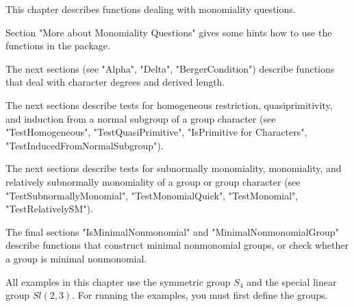 
This chapter describes functions dealing with monomiality questions.

Section "More about Monomiality Questions" gives some hints how to use
the functions in the package.

The next sections (see "Alpha", "Delta", "BergerCondition") describe
functions that deal with character degrees and derived length.

The next sections describe tests for homogeneous restriction,
quasiprimitivity, and induction from a normal subgroup of a group character
(see "TestHomogeneous", "TestQuasiPrimitive", "IsPrimitive for Characters",
"TestInducedFromNormalSubgroup").

The next sections describe tests for subnormally monomiality, monomiality,
and relatively subnormally monomiality of a group or group character
(see "TestSubnormallyMonomial", "TestMonomialQuick", "TestMonomial",
"TestRelativelySM").

The final sections "IsMinimalNonmonomial" and "MinimalNonmonomialGroup"
describe functions that construct minimal nonmonomial groups, or check
whether a group is minimal nonmonomial.

\vspace{3mm}

All examples in this chapter use the symmetric group $S_4$ and the
special linear group $Sl(2,3)$.  For running the examples, you must first
define the groups.

